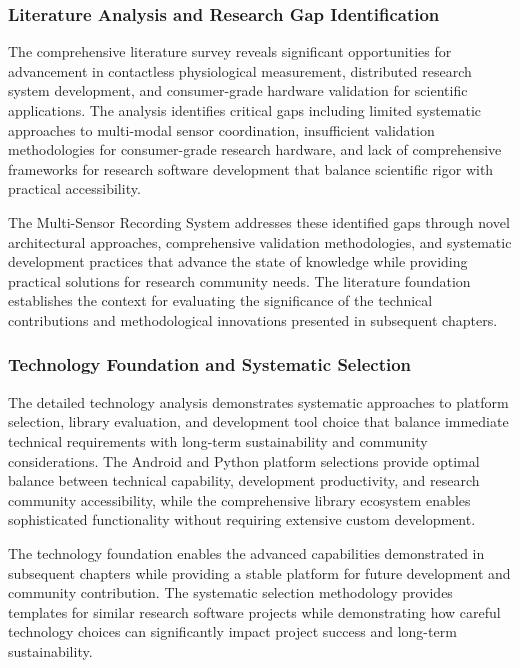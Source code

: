 \documentclass[11pt,a4paper]{article}
\begin{document}
\subsubsection{Literature Analysis and Research Gap Identification}

The comprehensive literature survey reveals significant opportunities for advancement in contactless physiological
measurement, distributed research system development, and consumer-grade hardware validation for scientific
applications. The analysis identifies critical gaps including limited systematic approaches to multi-modal sensor
coordination, insufficient validation methodologies for consumer-grade research hardware, and lack of comprehensive
frameworks for research software development that balance scientific rigor with practical accessibility.

The Multi-Sensor Recording System addresses these identified gaps through novel architectural approaches, comprehensive
validation methodologies, and systematic development practices that advance the state of knowledge while providing
practical solutions for research community needs. The literature foundation establishes the context for evaluating the
significance of the technical contributions and methodological innovations presented in subsequent chapters.

\subsubsection{Technology Foundation and Systematic Selection}

The detailed technology analysis demonstrates systematic approaches to platform selection, library evaluation, and
development tool choice that balance immediate technical requirements with long-term sustainability and community
considerations. The Android and Python platform selections provide optimal balance between technical capability,
development productivity, and research community accessibility, while the comprehensive library ecosystem enables
sophisticated functionality without requiring extensive custom development.

The technology foundation enables the advanced capabilities demonstrated in subsequent chapters while providing a stable
platform for future development and community contribution. The systematic selection methodology provides templates for
similar research software projects while demonstrating how careful technology choices can significantly impact project
success and long-term sustainability.
\end{document}
